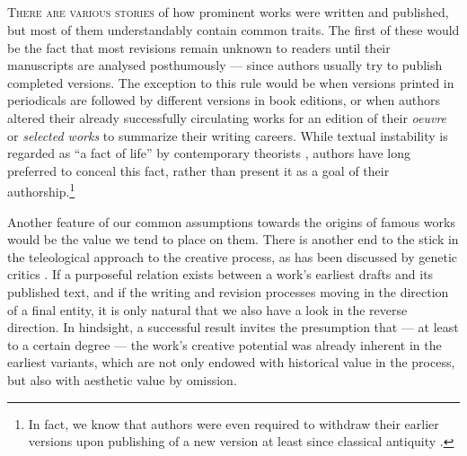 \begin{paper}
\section*{} 
\textsc{There are various stories} of how prominent works were written and
published, but most of them understandably contain common traits.\renewcommand*{\thefootnote}{\fnsymbol{footnote}}\footnotemark[1]\renewcommand*{\thefootnote}{\arabic{footnote}} The first of these would be the
fact that most revisions remain unknown to readers
until their manuscripts are analysed posthumously --- since
authors usually try to publish completed versions. The exception to this rule would be when versions printed in periodicals are followed
by different versions in book editions, or when authors altered their
already successfully circulating works for an edition of their
\emph{oeuvre} or \emph{selected works} to summarize their writing careers. While textual instability is regarded as ``a fact of life'' by contemporary theorists \citep[194]{shillingsburg_textuality_2017}, authors have long preferred to conceal this fact, rather than present it as a goal of their authorship.\footnote{In fact, we know that authors were even required to withdraw their earlier versions upon publishing of a
  new version at least since classical antiquity \citep[see][24]{reynolds_scribes_1991}.}

Another feature of our common assumptions towards the
origins of famous works would be the value we tend to place on them. There is another end to the stick in the teleological approach
to the creative process, as has been discussed by genetic
critics \citep[see][56]{bushell_intention_2005}. If a purposeful relation exists between a work's
earliest drafts and its published text, and if the
writing and revision processes moving in the direction of a final entity, it is only
natural that we also have a look in the reverse direction. In hindsight, a successful
result invites the presumption that --- at least to a
certain degree --- the work's creative potential was already inherent in the earliest variants, which are not only endowed
with historical value in the process, but also with aesthetic value by omission.


\end{paper}
